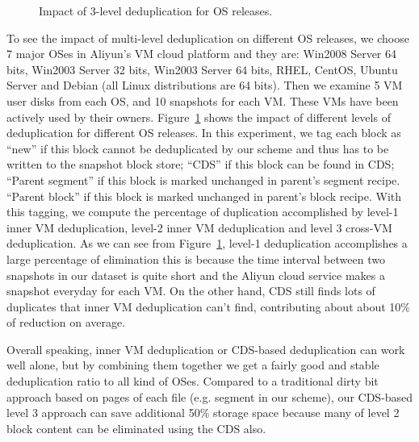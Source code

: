 \begin{figure}
  \centering
  \caption{Impact of 3-level deduplication for OS releases.}
  \label{fig:oscds}
\end{figure}

To see the impact of multi-level deduplication on different OS releases, we choose 7 major OSes in Aliyun's
VM cloud platform and they are: 
Win2008 Server 64 bits, Win2003 Server 32 bits, Win2003 Server 64 bits, RHEL, CentOS, Ubuntu Server and Debian (all Linux
distributions are 64 bits).
Then we examine 5 VM user disks from each OS, and 10 snapshots for each VM. These VMs have been actively used by their
owners. 
Figure~\ref{fig:oscds} shows the impact of different levels of deduplication for different OS releases.
In this experiment, we tag each block as  ``new''
if this block cannot be deduplicated by our scheme and thus has to be written to the snapshot block store;
``CDS''  if this block can be found  in CDS;
``Parent segment'' if  this block is marked unchanged in parent's segment recipe.
``Parent block'' if  this block is marked unchanged in parent's block recipe.
With this tagging, we compute the percentage of duplication accomplished by level-1 inner VM deduplication,
level-2 inner VM deduplication and level 3 cross-VM deduplication.
As we can see from Figure~\ref{fig:oscds}, level-1 deduplication accomplishes a large percentage of elimination
this is because the time interval between two snapshots in our dataset
is quite short and the Aliyun cloud service makes a snapshot  everyday  for each VM.
On the other hand,  CDS still finds lots of duplicates that inner VM deduplication can't find,
contributing about about 10\% of reduction on average.


Overall speaking, inner   VM deduplication or  CDS-based deduplication
can work well alone, but by combining them together we get a fairly good and stable deduplication ratio to 
all kind of OSes. 
Compared to a traditional dirty bit approach based on pages of
each file (e.g. segment in our scheme),
our CDS-based level 3 approach  can save additional 50\% storage space because many of level 2 block
content can be eliminated using the CDS also.

